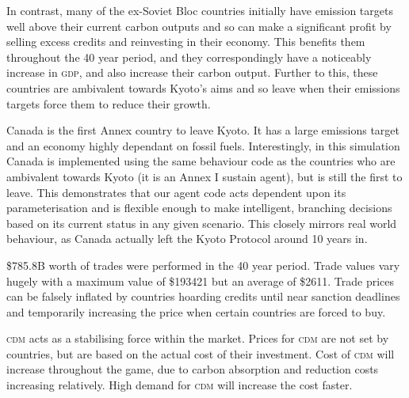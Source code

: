 In contrast, many of the ex-Soviet Bloc countries initially have emission targets well above their current carbon outputs and so can make a significant profit by selling excess credits and reinvesting in their economy. This benefits them throughout the 40 year period, and they correspondingly have a noticeably increase in \textsc{gdp}, and also increase their carbon output. Further to this, these countries are ambivalent towards Kyoto’s aims and so leave when their emissions targets force them to reduce their growth.

Canada is the first Annex country to leave Kyoto. It has a large emissions target and an economy highly dependant on fossil fuels. Interestingly, in this simulation Canada is implemented using the same behaviour code as the countries who are ambivalent towards Kyoto (it is an Annex I sustain agent), but is still the first to leave. This demonstrates that our agent code acts dependent upon its parameterisation and is flexible enough to make intelligent, branching decisions based on its current status in any given scenario. This closely mirrors real world behaviour, as Canada actually left the Kyoto Protocol around 10 years in.

\$785.8B worth of trades were performed in the 40 year period. Trade values vary hugely with a maximum value of \$193421 but an average of \$2611. Trade prices can be falsely inflated by countries hoarding credits until near sanction deadlines and temporarily increasing the price when certain countries are forced to buy.

\textsc{cdm} acts as a stabilising force within the market. Prices for \textsc{cdm} are not set by countries, but are based on the actual cost of their investment. Cost of \textsc{cdm} will increase throughout the game, due to carbon absorption and reduction costs increasing relatively. High demand for \textsc{cdm} will increase the cost faster.

